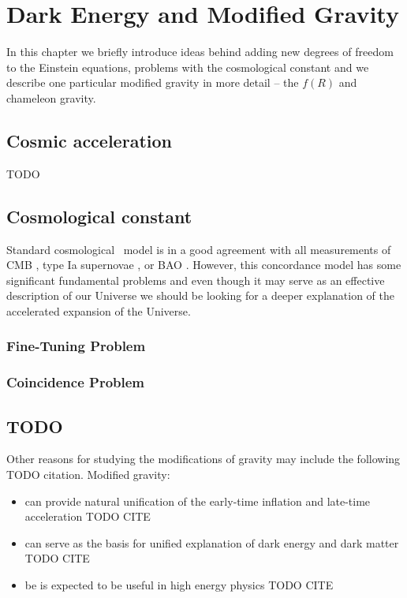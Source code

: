 \chapter{Dark Energy and Modified Gravity}
In this chapter we briefly introduce ideas behind adding new degrees of freedom to the Einstein equations, problems with the cosmological constant and we describe one particular modified gravity in more detail -- the $f(R)$ and chameleon gravity.
\section{Cosmic acceleration}
TODO

\section{Cosmological constant}
Standard cosmological \LCDM\ model is in a good agreement with all measurements of CMB \parencite{planck_cosm}, type Ia supernovae \parencite{Abbott_2019}, or BAO \parencite{BAO_results}. However, this concordance model has some significant fundamental problems and even though it may serve as an effective description of our Universe we should be looking for a deeper explanation of the accelerated expansion of the Universe.
\subsection{Fine-Tuning Problem}
\subsection{Coincidence Problem}

\section{TODO}
Other reasons for studying the modifications of gravity may include the following TODO citation. Modified gravity:
\begin{itemize}
	\item can provide natural unification of the early-time inflation and late-time acceleration TODO CITE
	\item can serve as the basis for unified explanation of dark energy and dark matter TODO CITE
	\item be is expected to be useful in high energy physics TODO CITE
\end{itemize}

